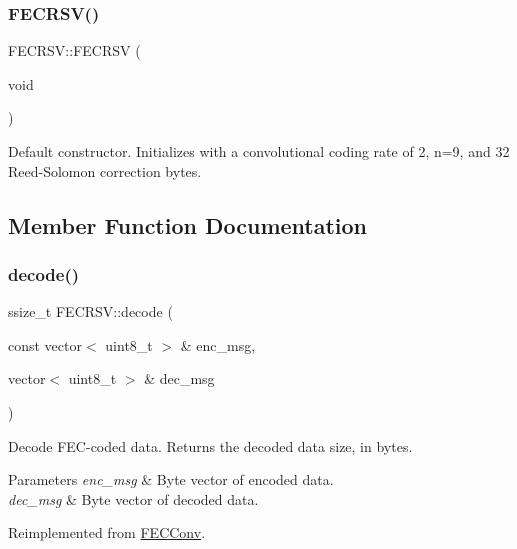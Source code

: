\subsubsection{\texorpdfstring{F\+E\+C\+R\+S\+V()}{FECRSV()}\hspace{0.1cm}{\footnotesize\ttfamily [2/2]}}
{\footnotesize\ttfamily F\+E\+C\+R\+S\+V\+::\+F\+E\+C\+R\+SV (\begin{DoxyParamCaption}\item[{void}]{ }\end{DoxyParamCaption})\hspace{0.3cm}{\ttfamily [inline]}}

Default constructor. Initializes with a convolutional coding rate of 2, n=9, and 32 Reed-\/\+Solomon correction bytes. 

\subsection{Member Function Documentation}
\mbox{\label{classFECRSV_a4781900bd59579d7a380687c59179ae5}} 
\subsubsection{\texorpdfstring{decode()}{decode()}}
{\footnotesize\ttfamily ssize\+\_\+t F\+E\+C\+R\+S\+V\+::decode (\begin{DoxyParamCaption}\item[{const vector$<$ uint8\+\_\+t $>$ \&}]{enc\+\_\+msg,  }\item[{vector$<$ uint8\+\_\+t $>$ \&}]{dec\+\_\+msg }\end{DoxyParamCaption})\hspace{0.3cm}{\ttfamily [virtual]}}

Decode F\+E\+C-\/coded data. Returns the decoded data size, in bytes. 
\begin{DoxyParams}{Parameters}
{\em enc\+\_\+msg} & Byte vector of encoded data. \\
\hline
{\em dec\+\_\+msg} & Byte vector of decoded data. \\
\hline
\end{DoxyParams}


Reimplemented from \hyperlink{classFECConv_afd897d6756bbbe4874942654e91a95e3}{F\+E\+C\+Conv}.

\mbox{\label{classFECRSV_ac9bd3fe4c494067e6f24a1287b0c562e}} 
